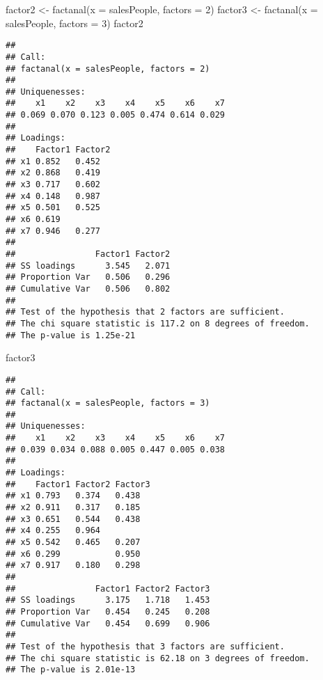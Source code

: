 \documentclass[
]{article}
\newenvironment{Shaded}{\begin{snugshade}}{\end{snugshade}}
\newcommand{\AttributeTok}[1]{\textcolor[rgb]{0.77,0.63,0.00}{#1}}
\newcommand{\DecValTok}[1]{\textcolor[rgb]{0.00,0.00,0.81}{#1}}
\newcommand{\FunctionTok}[1]{\textcolor[rgb]{0.00,0.00,0.00}{#1}}
\newcommand{\NormalTok}[1]{#1}
\newcommand{\OtherTok}[1]{\textcolor[rgb]{0.56,0.35,0.01}{#1}}
\begin{document}
\begin{Shaded}
\begin{Highlighting}[]
\NormalTok{factor2 }\OtherTok{\textless{}{-}} \FunctionTok{factanal}\NormalTok{(}\AttributeTok{x =}\NormalTok{ salesPeople, }\AttributeTok{factors =} \DecValTok{2}\NormalTok{)}
\NormalTok{factor3 }\OtherTok{\textless{}{-}} \FunctionTok{factanal}\NormalTok{(}\AttributeTok{x =}\NormalTok{ salesPeople, }\AttributeTok{factors =} \DecValTok{3}\NormalTok{)}
\NormalTok{factor2}
\end{Highlighting}
\end{Shaded}

\begin{verbatim}
## 
## Call:
## factanal(x = salesPeople, factors = 2)
## 
## Uniquenesses:
##    x1    x2    x3    x4    x5    x6    x7 
## 0.069 0.070 0.123 0.005 0.474 0.614 0.029 
## 
## Loadings:
##    Factor1 Factor2
## x1 0.852   0.452  
## x2 0.868   0.419  
## x3 0.717   0.602  
## x4 0.148   0.987  
## x5 0.501   0.525  
## x6 0.619          
## x7 0.946   0.277  
## 
##                Factor1 Factor2
## SS loadings      3.545   2.071
## Proportion Var   0.506   0.296
## Cumulative Var   0.506   0.802
## 
## Test of the hypothesis that 2 factors are sufficient.
## The chi square statistic is 117.2 on 8 degrees of freedom.
## The p-value is 1.25e-21
\end{verbatim}

\begin{Shaded}
\begin{Highlighting}[]
\NormalTok{factor3}
\end{Highlighting}
\end{Shaded}

\begin{verbatim}
## 
## Call:
## factanal(x = salesPeople, factors = 3)
## 
## Uniquenesses:
##    x1    x2    x3    x4    x5    x6    x7 
## 0.039 0.034 0.088 0.005 0.447 0.005 0.038 
## 
## Loadings:
##    Factor1 Factor2 Factor3
## x1 0.793   0.374   0.438  
## x2 0.911   0.317   0.185  
## x3 0.651   0.544   0.438  
## x4 0.255   0.964          
## x5 0.542   0.465   0.207  
## x6 0.299           0.950  
## x7 0.917   0.180   0.298  
## 
##                Factor1 Factor2 Factor3
## SS loadings      3.175   1.718   1.453
## Proportion Var   0.454   0.245   0.208
## Cumulative Var   0.454   0.699   0.906
## 
## Test of the hypothesis that 3 factors are sufficient.
## The chi square statistic is 62.18 on 3 degrees of freedom.
## The p-value is 2.01e-13
\end{verbatim}
\end{document}

